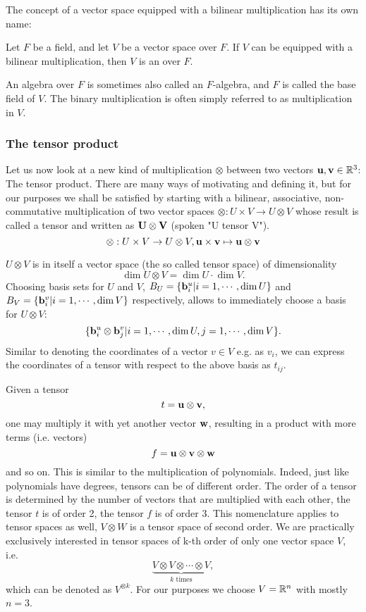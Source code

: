 The concept of a vector space equipped with a bilinear multiplication has its own name:
\begin{definition}[Algebra]
	Let $F$ be a field, and let $V$ be a vector space over $F$. If $V$ can be equipped with a bilinear multiplication, then $V$ is an  over $F$. 
\end{definition}
An algebra over $F$ is sometimes also called an $F$-algebra, and $F$ is called the base field of $V$. The binary multiplication is often simply referred to as multiplication in $V$. 

\subsubsection{The tensor product}
Let us now look at a new kind of multiplication $\otimes$ between two vectors $\mathbf{u},\mathbf{v} \in \mathbb{R}^3$: The tensor product. There are many ways of motivating and defining it, but for our purposes we shall be satisfied by starting with a bilinear, associative, non-commutative multiplication of two vector spaces $\otimes: U \times V \to U \otimes V$ whose result is called a tensor and written as $\mathbf{U}\otimes\mathbf{V}$ (spoken "U tensor V").
\[\otimes: U \times V \to U \otimes V,\mathbf{u}\times\mathbf{v} \mapsto \mathbf{u}\otimes\mathbf{v}\]

$U\otimes V$ is in itself a vector space (the so called tensor space) of dimensionality 
\[\dim{U \otimes V} = \dim{U} \cdot \dim{V}.\]
Choosing basis sets for $U$ and $V$, $B_U = \{\mathbf{b}_i^u| i=1, \cdots, \dim{U}\}$ and $B_V=\{\mathbf{b}_i^v| i=1, \cdots, \dim{V}\}$ respectively, allows to immediately choose a basis for $U\otimes V$: 
\[\{\mathbf{b}_i^u\otimes \mathbf{b}_j^v| i=1, \cdots, \dim{U, j=1,\cdots,\dim{V}}\}.\]
Similar to denoting the coordinates of a vector $v\in V$ e.g. as $v_i$, we can express the coordinates of a tensor with respect to the above basis as $t_{ij}$.


Given a tensor 
\[t=\mathbf{u}\otimes\mathbf{v},\] 
one may multiply it with yet another vector $\mathbf{w}$, resulting in a product with more terms (i.e. vectors)
\[f=\mathbf{u}\otimes\mathbf{v}\otimes\mathbf{w}\] 
and so on. This is similar to the multiplication of polynomials. Indeed, just like polynomials have degrees, tensors can be of different order. The order of a tensor is determined by the number of vectors that are multiplied with each other, the tensor $t$ is of order 2, the tensor $f$ is of order 3. This nomenclature applies to tensor spaces as well, $V\otimes W$ is a tensor space of second order. We are practically exclusively interested in tensor spaces of k-th order of only one vector space $V$, i.e. 
\[\underbrace{V\otimes V \otimes \cdots \otimes V}_{k \text{ times}},\]
which can be denoted as $V^{\otimes k}$. For our purposes we choose $V=\mathbb{R}^n$ with mostly $n=3$.

